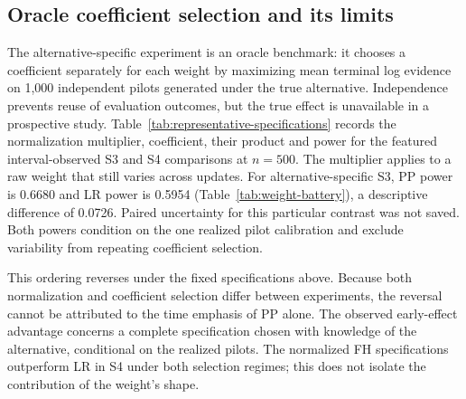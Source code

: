 \documentclass[12pt]{article}
\theoremstyle{definition}
\theoremstyle{remark}
\begin{document}
\subsection{Oracle coefficient selection and its limits}
\label{sec:oracle-comparison}

The alternative-specific experiment is an oracle benchmark: it chooses a coefficient separately for each weight by maximizing mean terminal log evidence on 1,000 independent pilots generated under the true alternative. Independence prevents reuse of evaluation outcomes, but the true effect is unavailable in a prospective study. Table~\ref{tab:representative-specifications} records the normalization multiplier, coefficient, their product and power for the featured interval-observed S3 and S4 comparisons at $n=500$. The multiplier applies to a raw weight that still varies across updates. For alternative-specific S3, PP power is 0.6680 and LR power is 0.5954 (Table~\ref{tab:weight-battery}), a descriptive difference of 0.0726. Paired uncertainty for this particular contrast was not saved. Both powers condition on the one realized pilot calibration and exclude variability from repeating coefficient selection.

This ordering reverses under the fixed specifications above. Because both normalization and coefficient selection differ between experiments, the reversal cannot be attributed to the time emphasis of PP alone. The observed early-effect advantage concerns a complete specification chosen with knowledge of the alternative, conditional on the realized pilots. The normalized FH specifications outperform LR in S4 under both selection regimes; this does not isolate the contribution of the weight's shape.
\end{document}

